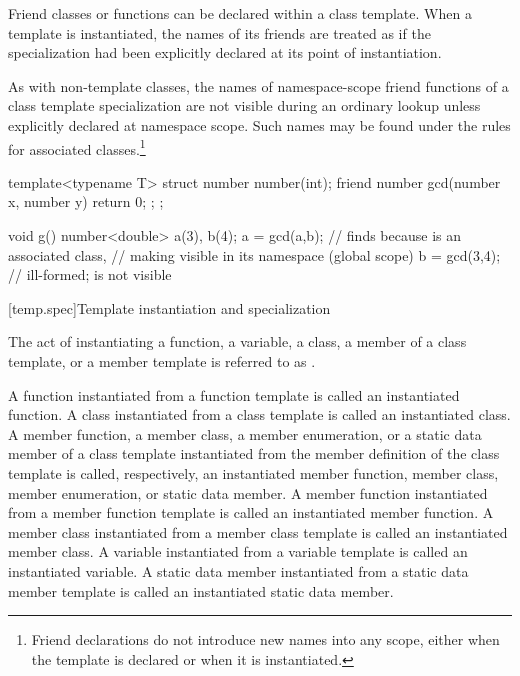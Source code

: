\pnum
Friend classes or functions can be declared within a class template.
When a template is instantiated, the names of its friends are treated
as if the specialization had been explicitly declared at its point of
instantiation.

\pnum
As with non-template classes, the names of namespace-scope friend
functions of a class template specialization are not visible during
an ordinary lookup unless explicitly declared at namespace scope.
Such names may be found under the rules for associated
classes.\footnote{Friend declarations do not
introduce new names into any scope, either
when the template is declared or when it is instantiated.}
\begin{example}
\begin{codeblock}
template<typename T> struct number {
  number(int);
  friend number gcd(number x, number y) { return 0; };
};

void g() {
  number<double> a(3), b(4);
  a = gcd(a,b);     // finds  because  is an associated class,
                    // making  visible in its namespace (global scope)
  b = gcd(3,4);     // ill-formed;  is not visible
}
\end{codeblock}
\end{example}

[temp.spec]{Template instantiation and specialization}

\pnum
{}%
The act of instantiating a function, a variable,
a class, a member of a class template, or
a member template is referred to as
.

\pnum
A function instantiated from a function template is called an instantiated
function.
A class instantiated from a class template is called an instantiated class.
A member function, a member class, a member enumeration, or a static data member of a class template
instantiated from the member definition of the class template is called,
respectively, an instantiated member function, member class, member enumeration, or static data
member.
A member function instantiated from a member function template is called an
instantiated member function.
A member class instantiated from a member class template is called an
instantiated member class.
A variable instantiated from a variable template is called an
instantiated variable.
A static data member instantiated from a static data member template
is called an instantiated static data member.

